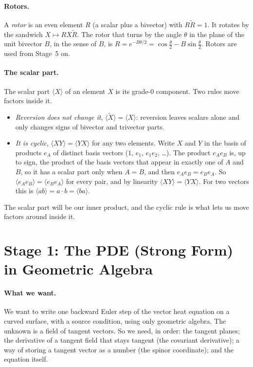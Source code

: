 \paragraph{Rotors.} A \emph{rotor} is an even element $R$ (a scalar plus a bivector) with $R\widetilde R = 1$. It rotates by the sandwich $X \mapsto R X \widetilde R$. The rotor that turns by the angle $\theta$ in the plane of the unit bivector $B$, in the sense of $B$, is $R = e^{-B\theta/2} = \cos\frac\theta2 - B\sin\frac\theta2$. Rotors are used from Stage~5 on.

\paragraph{The scalar part.} The scalar part $\langle X\rangle$ of an element $X$ is its grade-$0$ component. Two rules move factors inside it.
\begin{itemize}
\item \emph{Reversion does not change it}, $\langle \widetilde X\rangle = \langle X\rangle$: reversion leaves scalars alone and only changes signs of bivector and trivector parts.
\item \emph{It is cyclic}, $\langle XY\rangle = \langle YX\rangle$ for any two elements. Write $X$ and $Y$ in the basis of products $e_A$ of distinct basis vectors ($1$, $e_1$, $e_1e_2$, \dots). The product $e_Ae_B$ is, up to sign, the product of the basis vectors that appear in exactly one of $A$ and $B$, so it has a scalar part only when $A = B$, and then $e_Ae_B = e_Be_A$. So $\langle e_Ae_B\rangle = \langle e_Be_A\rangle$ for every pair, and by linearity $\langle XY\rangle = \langle YX\rangle$. For two vectors this is $\langle ab\rangle = a\cdot b = \langle ba\rangle$.
\end{itemize}
The scalar part will be our inner product, and the cyclic rule is what lets us move factors around inside it.

\section{Stage 1: The PDE (Strong Form) in Geometric Algebra}
\label{section:r2_stage1}

\paragraph{What we want.} We want to write one backward Euler step of the vector heat equation on a curved surface, with a source condition, using only geometric algebra. The unknown is a field of tangent vectors. So we need, in order: the tangent planes; the derivative of a tangent field that stays tangent (the covariant derivative); a way of storing a tangent vector as a number (the spinor coordinate); and the equation itself.

